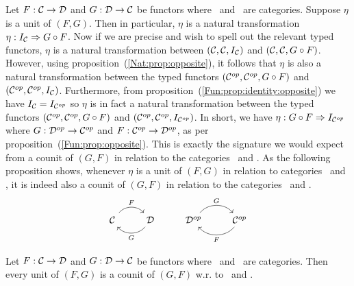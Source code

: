 Let $F:\mbox{$\cal C$}\to\mbox{$\cal D$}$ and $G:\mbox{$\cal D$}\to\mbox{$\cal C$}$ be functors where \Cat\ and \Dat\ 
are categories. Suppose $\eta$ is a unit of $(F,G)$. Then in particular,
$\eta$ is a natural transformation $\eta:I_{\cal C}\Rightarrow G\circ F$.
Now if we are precise and wish to spell out the relevant typed functors,
$\eta$ is a natural transformation between $(\mbox{$\cal C$},\mbox{$\cal C$},I_{\cal C})$ and
$(\mbox{$\cal C$},\mbox{$\cal C$},G\circ F)$. However, using proposition~(\ref{Nat:prop:opposite}),
it follows that $\eta$ is also a natural transformation between the typed
functors $(\mbox{${\cal C}^{op}$},\mbox{${\cal C}^{op}$},G\circ F)$ and $(\mbox{${\cal C}^{op}$},\mbox{${\cal C}^{op}$},I_{\cal C})$. Furthermore,
from proposition~(\ref{Fun:prop:identity:opposite}) we have $I_{\cal C}=
I_{{\cal C}^{op}}$ so $\eta$ is in fact a natural transformation between
the typed functors $(\mbox{${\cal C}^{op}$},\mbox{${\cal C}^{op}$},G\circ F)$ and $(\mbox{${\cal C}^{op}$},\mbox{${\cal C}^{op}$},I_{{\cal C}^{op}})$.
In short, we have $\eta:G\circ F\Rightarrow I_{{\cal C}^{op}}$ where 
$G:\mbox{${\cal D}^{op}$}\to\mbox{${\cal C}^{op}$}$ and $F:\mbox{${\cal C}^{op}$}\to\mbox{${\cal D}^{op}$}$, as per proposition~(\ref{Fun:prop:opposite}).
This is exactly the signature we would expect from a counit of $(G,F)$ in 
relation to the categories \Dop\ and \Cop. As the following proposition shows, 
whenever $\eta$ is a unit of $(F,G)$ in relation to categories \Cat\ and \Dat, 
it is indeed also a counit of $(G,F)$ in relation to the categories 
\Dop\ and \Cop.
    \[
        \begin{tikzcd}
              \Cat \arrow[r, "F", bend left  = 50, ""{name=U, below}]
            & \Dat \arrow[l, "G", bend left = 50, ""{name=D, above}]
            & \Dop \arrow[r, "G", bend left  = 50, ""{name=U, below}]
            & \Cop \arrow[l, "F", bend left  = 50, ""{name=U, below}]
        \end{tikzcd}
    \]
\begin{prop}\label{Adj:prop:opposite}
    Let $F:\mbox{$\cal C$}\to\mbox{$\cal D$}$ and $G:\mbox{$\cal D$}\to\mbox{$\cal C$}$ be functors where \Cat\ and \Dat\ 
    are categories. Then every unit of $(F,G)$ is
    a counit of $(G,F)$ w.r. to \Dop\ and \Cop.
\end{prop}
